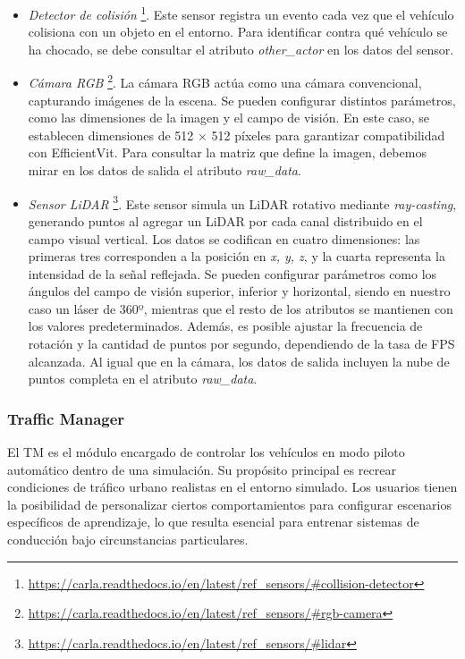 \begin{itemize}
\item \textit{Detector de colisión} \footnote{\url{https://carla.readthedocs.io/en/latest/ref_sensors/\#collision-detector}}. Este sensor registra un evento cada vez que el vehículo colisiona con un objeto en el entorno. Para identificar contra qué vehículo se ha chocado, se debe consultar el atributo \textit{other\_actor} en los datos del sensor.

\item \textit{Cámara RGB} \footnote{\url{https://carla.readthedocs.io/en/latest/ref_sensors/\#rgb-camera}}. La cámara RGB actúa como una cámara convencional, capturando imágenes de la escena. Se pueden configurar distintos parámetros, como las dimensiones de la imagen y el campo de visión. En este caso, se establecen dimensiones de 512 × 512 píxeles para garantizar compatibilidad con EfficientVit. Para consultar la matriz que define la imagen, debemos mirar en los datos de salida el atributo \textit{raw\_data}.

\item \textit{Sensor \ac{LiDAR}} \footnote{\url{https://carla.readthedocs.io/en/latest/ref_sensors/\#lidar}}. Este sensor simula un \ac{LiDAR} rotativo mediante \textit{ray-casting}, generando puntos al agregar un \ac{LiDAR} por cada canal distribuido en el campo visual vertical. Los datos se codifican en cuatro dimensiones: las primeras tres corresponden a la posición en \textit{x, y, z}, y la cuarta representa la intensidad de la señal reflejada. Se pueden configurar parámetros como los ángulos del campo de visión superior, inferior y horizontal, siendo en nuestro caso un láser de 360º, mientras que el resto de los atributos se mantienen con los valores predeterminados. Además, es posible ajustar la frecuencia de rotación y la cantidad de puntos por segundo, dependiendo de la tasa de FPS alcanzada. Al igual que en la cámara, los datos de salida incluyen la nube de puntos completa en el atributo \textit{raw\_data}.
\end{itemize}

\subsubsection{Traffic Manager}

El \ac{TM} es el módulo encargado de controlar los vehículos en modo piloto automático dentro de una simulación. Su propósito principal es recrear condiciones de tráfico urbano realistas en el entorno simulado. Los usuarios tienen la posibilidad de personalizar ciertos comportamientos para configurar escenarios específicos de aprendizaje, lo que resulta esencial para entrenar sistemas de conducción bajo circunstancias particulares.

